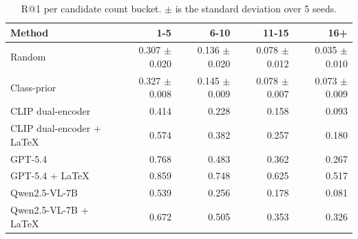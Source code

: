 \begin{table}[t]
\centering
\caption{R@1 per candidate count bucket. $\pm$ is the standard deviation over 5 seeds.}
\label{tab:bd_candidate_count_r1}
\begin{tabular}{lrrrr}
\toprule
Method & 1-5 & 6-10 & 11-15 & 16+ \\
\midrule
Random & 0.307 $\pm$ 0.020 & 0.136 $\pm$ 0.020 & 0.078 $\pm$ 0.012 & 0.035 $\pm$ 0.010 \\
Class-prior & 0.327 $\pm$ 0.008 & 0.145 $\pm$ 0.009 & 0.078 $\pm$ 0.007 & 0.073 $\pm$ 0.009 \\
CLIP dual-encoder & 0.414 & 0.228 & 0.158 & 0.093 \\
CLIP dual-encoder + LaTeX & 0.574 & 0.382 & 0.257 & 0.180 \\
GPT-5.4 & 0.768 & 0.483 & 0.362 & 0.267 \\
GPT-5.4 + LaTeX & 0.859 & 0.748 & 0.625 & 0.517 \\
Qwen2.5-VL-7B & 0.539 & 0.256 & 0.178 & 0.081 \\
Qwen2.5-VL-7B + LaTeX & 0.672 & 0.505 & 0.353 & 0.326 \\
\bottomrule
\end{tabular}
\end{table}

